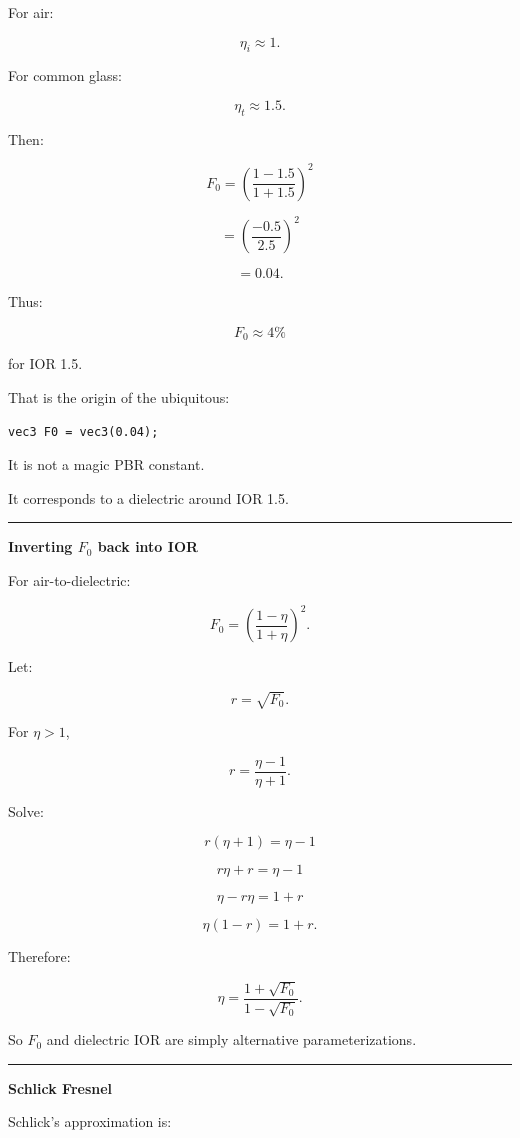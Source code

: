 For air:

\[
\eta_i\approx1.
\]

For common glass:

\[
\eta_t\approx1.5.
\]

Then:

\[
F_0=
\left(
\frac{1-1.5}
{1+1.5}
\right)^2
\]

\[
=
\left(
\frac{-0.5}{2.5}
\right)^2
\]

\[
=
0.04.
\]

Thus:

\[
\boxed{F_0\approx4\%}
\]

for IOR 1.5.

That is the origin of the ubiquitous:

\begin{verbatim}
vec3 F0 = vec3(0.04);
\end{verbatim}

It is not a magic PBR constant.

It corresponds to a dielectric around IOR 1.5.

\begin{center}\rule{0.5\linewidth}{0.5pt}\end{center}

\textbf{Inverting \(F_0\) back into IOR}

For air-to-dielectric:

\[
F_0=
\left(
\frac{1-\eta}
{1+\eta}
\right)^2.
\]

Let:

\[
r=\sqrt{F_0}.
\]

For \(\eta>1\),

\[
r=
\frac{\eta-1}{\eta+1}.
\]

Solve:

\[
r(\eta+1)=\eta-1
\]

\[
r\eta+r=\eta-1
\]

\[
\eta-r\eta=1+r
\]

\[
\eta(1-r)=1+r.
\]

Therefore:

\[
\boxed{
\eta=
\frac{1+\sqrt{F_0}}
{1-\sqrt{F_0}}.
}
\]

So \(F_0\) and dielectric IOR are simply alternative parameterizations.

\begin{center}\rule{0.5\linewidth}{0.5pt}\end{center}

\textbf{Schlick Fresnel}

Schlick's approximation is:

